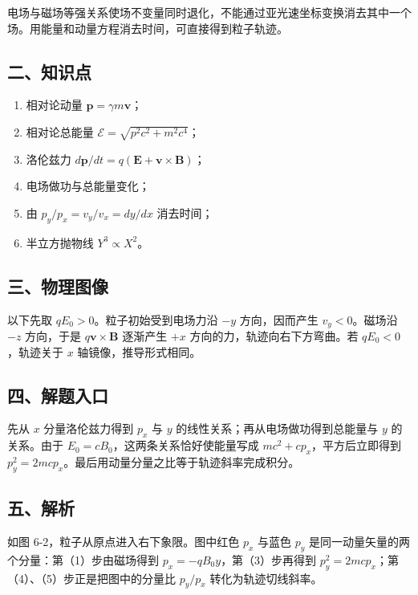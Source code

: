 \documentclass[12pt,a4paper,UTF8]{ctexart}
\newcommand{\tightlist}{\setlength{\itemsep}{0pt}\setlength{\parskip}{0pt}}
\begin{document}
电场与磁场等强关系使场不变量同时退化，不能通过亚光速坐标变换消去其中一个场。用能量和动量方程消去时间，可直接得到粒子轨迹。

\subsection{二、知识点}\label{ux4e8cux77e5ux8bc6ux70b9-5}

\begin{enumerate}
\def\labelenumi{\arabic{enumi}.}
\tightlist
\item
  相对论动量 \(\bm p=\gamma m\bm v\)；
\item
  相对论总能量 \(\mathcal E=\sqrt{p^2c^2+m^2c^4}\)；
\item
  洛伦兹力 \(d\bm p/dt=q(\bm E+\bm v\times\bm B)\)；
\item
  电场做功与总能量变化；
\item
  由 \(p_y/p_x=v_y/v_x=dy/dx\) 消去时间；
\item
  半立方抛物线 \(Y^3\propto X^2\)。
\end{enumerate}

\subsection{三、物理图像}\label{ux4e09ux7269ux7406ux56feux50cf-5}

以下先取 \(qE_0>0\)。粒子初始受到电场力沿 \(-y\) 方向，因而产生
\(v_y<0\)。磁场沿 \(-z\) 方向，于是 \(q\bm v\times\bm B\) 逐渐产生
\(+x\) 方向的力，轨迹向右下方弯曲。若 \(qE_0<0\)，轨迹关于 \(x\)
轴镜像，推导形式相同。

\subsection{四、解题入口}\label{ux56dbux89e3ux9898ux5165ux53e3-5}

先从 \(x\) 分量洛伦兹力得到 \(p_x\) 与 \(y\)
的线性关系；再从电场做功得到总能量与 \(y\) 的关系。由于
\(E_0=cB_0\)，这两条关系恰好使能量写成 \(mc^2+cp_x\)，平方后立即得到
\(p_y^2=2mcp_x\)。最后用动量分量之比等于轨迹斜率完成积分。

\subsection{五、解析}\label{ux4e94ux89e3ux6790-5}

如图 6-2，粒子从原点进入右下象限。图中红色 \(p_x\) 与蓝色 \(p_y\)
是同一动量矢量的两个分量：第（1）步由磁场得到
\(p_x=-qB_0y\)，第（3）步再得到
\(p_y^2=2mcp_x\)；第（4）、（5）步正是把图中的分量比 \(p_y/p_x\)
转化为轨迹切线斜率。
\end{document}

